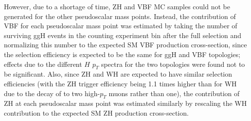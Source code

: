 However, due to a shortage of time, ZH and VBF MC samples could not be generated for the other pseudoscalar mass points. Instead, the contribution of VBF for each pseudoscalar mass point was estimated by taking the number of surviving ggH events in the counting experiment bin after the full selection and normalizing this number to the expected SM VBF production cross-section, since the selection efficiency is expected to be the same for ggH and VBF topologies; effects due to the different $H$ $p_T$ spectra for the two topologies were found not to be significant. Also, since ZH and WH are expected to have similar selection efficiencies (with the ZH trigger efficiency being 1.1 times higher than for WH due to the decay of \Z to two high-$p_T$ muons rather than one), the contribution of ZH at each pseudoscalar mass point was estimated similarly by rescaling the WH contribution to the expected SM ZH production cross-section.
